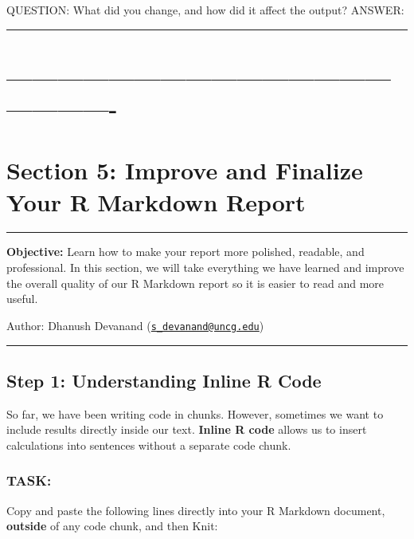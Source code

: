 \documentclass[
]{article}
\begin{document}
QUESTION: What did you change, and how did it affect the output? ANSWER:

\begin{center}\rule{0.5\linewidth}{0.5pt}\end{center}

\section{----------------------------------------------------------}\label{section}

\section{Section 5: Improve and Finalize Your R Markdown
Report}\label{section-5-improve-and-finalize-your-r-markdown-report}

\begin{center}\rule{0.5\linewidth}{0.5pt}\end{center}

\textbf{Objective:} Learn how to make your report more polished,
readable, and professional. In this section, we will take everything we
have learned and improve the overall quality of our R Markdown report so
it is easier to read and more useful.

Author: Dhanush Devanand
(\href{mailto:s_devanand@uncg.edu}{\nolinkurl{s\_devanand@uncg.edu}})

\begin{center}\rule{0.5\linewidth}{0.5pt}\end{center}

\subsection{Step 1: Understanding Inline R
Code}\label{step-1-understanding-inline-r-code}

So far, we have been writing code in chunks. However, sometimes we want
to include results directly inside our text. \textbf{Inline R code}
allows us to insert calculations into sentences without a separate code
chunk.

\subsubsection{TASK:}\label{task-6}

Copy and paste the following lines directly into your R Markdown
document, \textbf{outside} of any code chunk, and then Knit:
\end{document}
